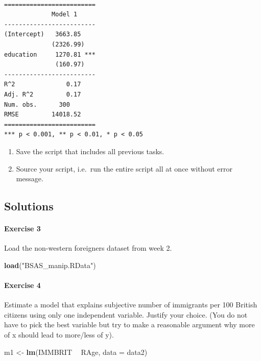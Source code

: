 \documentclass[]{article}
\newenvironment{Shaded}{\begin{snugshade}}{\end{snugshade}}
\newcommand{\KeywordTok}[1]{\textcolor[rgb]{0.13,0.29,0.53}{\textbf{#1}}}
\newcommand{\DataTypeTok}[1]{\textcolor[rgb]{0.13,0.29,0.53}{#1}}
\newcommand{\StringTok}[1]{\textcolor[rgb]{0.31,0.60,0.02}{#1}}
\newcommand{\OperatorTok}[1]{\textcolor[rgb]{0.81,0.36,0.00}{\textbf{#1}}}
\newcommand{\NormalTok}[1]{#1}
\providecommand{\tightlist}{%
  \setlength{\itemsep}{0pt}\setlength{\parskip}{0pt}}
\let\oldparagraph\paragraph
\renewcommand{\paragraph}[1]{\oldparagraph{#1}\mbox{}}
\theoremstyle{definition}
\theoremstyle{definition}
\theoremstyle{definition}
\theoremstyle{remark}
\begin{document}
\begin{verbatim}

=========================
             Model 1     
-------------------------
(Intercept)   3663.85    
             (2326.99)   
education     1270.81 ***
              (160.97)   
-------------------------
R^2              0.17    
Adj. R^2         0.17    
Num. obs.      300       
RMSE         14018.52    
=========================
*** p < 0.001, ** p < 0.01, * p < 0.05
\end{verbatim}

\begin{enumerate}
\def\labelenumi{\arabic{enumi}.}
\setcounter{enumi}{11}
\tightlist
\item
  Save the script that includes all previous tasks.
\item
  Source your script, i.e.~run the entire script all at once without
  error message.
\end{enumerate}

\subsection{Solutions}\label{solutions-5}

\paragraph{Exercise 3}\label{exercise-3-5}

Load the non-western foreigners dataset from week 2.

\begin{Shaded}
\begin{Highlighting}[]
\KeywordTok{load}\NormalTok{(}\StringTok{"BSAS_manip.RData"}\NormalTok{)}
\end{Highlighting}
\end{Shaded}

\paragraph{Exercise 4}\label{exercise-4-5}

Estimate a model that explains subjective number of immigrants per 100
British citizens using only one independent variable. Justify your
choice. (You do not have to pick the best variable but try to make a
reasonable argument why more of x should lead to more/less of y).

\begin{Shaded}
\begin{Highlighting}[]
\NormalTok{m1 <-}\StringTok{ }\KeywordTok{lm}\NormalTok{(IMMBRIT }\OperatorTok{~}\StringTok{ }\NormalTok{RAge, }\DataTypeTok{data =}\NormalTok{ data2)}
\end{Highlighting}
\end{Shaded}
\end{document}
